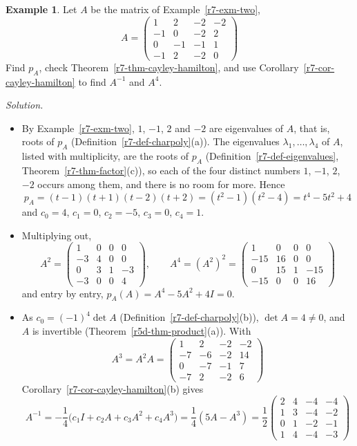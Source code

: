 \documentclass[12pt]{article}
\theoremstyle{definition}
\newtheorem{example}[theorem]{Example}
\begin{document}
\begin{example}\label{r7-exm-cayley-hamilton}
Let \(A\) be the matrix of Example~\ref{r7-exm-two},
\[
A=\begin{pmatrix}1&2&-2&-2\\-1&0&-2&2\\0&-1&-1&1\\-1&2&-2&0\end{pmatrix}
\]
Find \(p_A\), check Theorem~\ref{r7-thm-cayley-hamilton}, and use Corollary~\ref{r7-cor-cayley-hamilton} to find
\(A^{-1}\) and \(A^4\).

\textit{Solution.}
\begin{itemize}
\item By Example~\ref{r7-exm-two}, \(1\), \(-1\), \(2\) and \(-2\) are eigenvalues of \(A\), that is, roots of \(p_A\)
(Definition~\ref{r7-def-charpoly}(a)). The eigenvalues \(\lambda_1,\dots,\lambda_4\) of \(A\), listed with multiplicity,
are the roots of \(p_A\) (Definition~\ref{r7-def-eigenvalues}, Theorem~\ref{r7-thm-factor}(c)), so each of the four
distinct numbers \(1\), \(-1\), \(2\), \(-2\) occurs among them, and there is no room for more. Hence
\[
p_A=(t-1)(t+1)(t-2)(t+2)=(t^2-1)(t^2-4)=t^4-5t^2+4
\]
and \(c_0=4\), \(c_1=0\), \(c_2=-5\), \(c_3=0\), \(c_4=1\).
\item Multiplying out,
\[
A^2=\begin{pmatrix}1&0&0&0\\-3&4&0&0\\0&3&1&-3\\-3&0&0&4\end{pmatrix},\qquad
A^4=(A^2)^2=\begin{pmatrix}1&0&0&0\\-15&16&0&0\\0&15&1&-15\\-15&0&0&16\end{pmatrix}
\]
and entry by entry, \(p_A(A)=A^4-5A^2+4I=0\).
\item As \(c_0=(-1)^4\det A\) (Definition~\ref{r7-def-charpoly}(b)), \(\det A=4\ne0\), and \(A\) is invertible
(Theorem~\ref{r5d-thm-product}(a)). With
\[
A^3=A^2A=\begin{pmatrix}1&2&-2&-2\\-7&-6&-2&14\\0&-7&-1&7\\-7&2&-2&6\end{pmatrix}
\]
Corollary~\ref{r7-cor-cayley-hamilton}(b) gives
\[
A^{-1}=-\frac14\bigl(c_1I+c_2A+c_3A^2+c_4A^3\bigr)=\frac14(5A-A^3)
=\frac12\begin{pmatrix}2&4&-4&-4\\1&3&-4&-2\\0&1&-2&-1\\1&4&-4&-3\end{pmatrix}
\]
\end{itemize}
\end{example}
\end{document}
